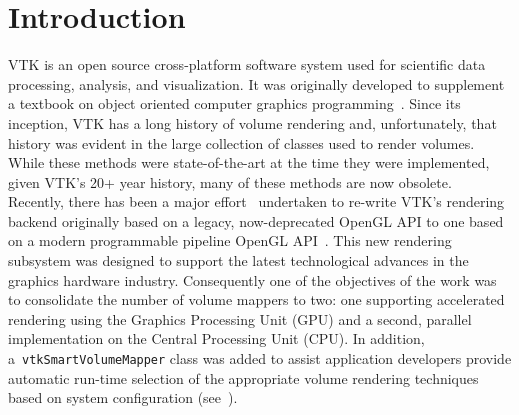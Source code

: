 \section{Introduction}
\label{introduction}
VTK is an open source cross-platform software system used for scientific data
processing, analysis, and visualization. It was originally developed to
supplement a textbook on object oriented computer graphics
programming~\citep{schroeder_visualization_2006, geveci_vtk_2012}.  Since its
inception, VTK has a long history of volume rendering and, unfortunately, that
history was evident in the large collection of classes used to render volumes.
While these methods were state-of-the-art at the time they were implemented,
given VTK's 20+ year history, many of these methods are now obsolete. Recently,
there has been a major effort~\citep{hanwell_visualization_2015} undertaken to
re-write VTK's rendering backend originally based on a legacy, now-deprecated
OpenGL API to one based on a modern programmable pipeline OpenGL
API~\citep{shreiner_opengl_2013}. This new rendering subsystem was designed to
support the latest technological advances in the graphics hardware industry.
Consequently one of the objectives of the work was to consolidate the number of
volume mappers to two: one supporting accelerated rendering using the Graphics
Processing Unit (GPU) and a second, parallel implementation on the Central
Processing Unit (CPU). In addition, a~\texttt{vtkSmartVolumeMapper} class was
added to assist application developers provide automatic run-time selection of
the appropriate volume rendering techniques based on system configuration
(see~).

